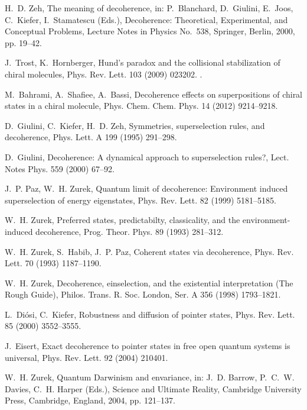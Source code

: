\documentclass[3p,sort&compress,12pt]{elsarticle}
\begin{document}
\begin{thebibliography}{100}
H.~D. Zeh, The meaning of decoherence, in: P.~Blanchard, D.~Giulini, E.~Joos,
  C.~Kiefer, I.~Stamatescu (Eds.), Decoherence: {T}heoretical, Experimental,
  and Conceptual Problems, Lecture Notes in Physics {No.\ 538}, Springer,
  Berlin, 2000, pp. 19--42.

J.~Trost, K.~Hornberger, Hund's paradox and the collisional stabilization of
  chiral molecules, Phys. Rev. Lett. 103 (2009) 023202.
\newblock \href {http://dx.doi.org/10.1103/PhysRevLett.103.023202}
  {}.

M.~Bahrami, A.~Shafiee, A.~Bassi, Decoherence effects on superpositions of
  chiral states in a chiral molecule, Phys. Chem. Chem. Phys. 14 (2012)
  9214--9218.

D.~Giulini, C.~Kiefer, H.~D. Zeh, Symmetries, superselection rules, and
  decoherence, Phys. Lett. A 199 (1995) 291--298.

D.~Giulini, Decoherence: A dynamical approach to superselection rules?, Lect.
  Notes Phys. 559 (2000) 67--92.

J.~P. Paz, W.~H. Zurek, Quantum limit of decoherence: Environment induced
  superselection of energy eigenstates, Phys. Rev. Lett. 82 (1999) 5181--5185.

W.~H. Zurek, Preferred states, predictabilty, classicality, and the
  environment-induced decoherence, Prog. Theor. Phys. 89 (1993) 281--312.

W.~H. Zurek, S.~Habib, J.~P. Paz, Coherent states via decoherence, Phys. Rev.
  Lett. 70 (1993) 1187--1190.

W.~H. Zurek, Decoherence, einselection, and the existential interpretation
  ({T}he {R}ough {G}uide), Philos. Trans. R. Soc. London, Ser. A 356 (1998)
  1793--1821.

L.~Di{\'o}si, C.~Kiefer, Robustness and diffusion of pointer states, Phys. Rev.
  Lett. 85 (2000) 3552--3555.

J.~Eisert, Exact decoherence to pointer states in free open quantum systems is
  universal, Phys. Rev. Lett. 92 (2004) 210401.

W.~H. Zurek, Quantum {D}arwinism and envariance, in: J.~D. Barrow, P.~C.~W.
  Davies, C.~H. Harper (Eds.), Science and Ultimate Reality, Cambridge
  University Press, Cambridge, England, 2004, pp. 121--137.


\end{thebibliography}
\end{document}
